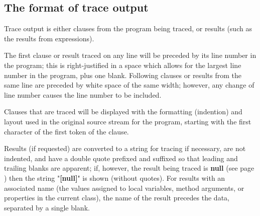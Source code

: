 \subsection{The format of trace output}
 
Trace output is either clauses from the program being traced, or results
(such as the results from expressions).
 
The first clause or result traced on any line will be preceded by its
line number in the program; this is right-justified in a space which
allows for the largest line number in the program, plus one blank.
Following clauses or results from the same line are preceded by white
space of the same width; however, any change of line number causes the
line number to be included.
 
Clauses that are traced will be displayed with the formatting
(indention) and layout used in the original source stream for the
program, starting with the first character of the first token of the
clause.
 
Results (if requested) are converted to a string for tracing if
necessary, are not indented, and have a double quote prefixed and
suffixed so that leading and trailing blanks are apparent; if, however,
the result being traced is  \textbf{null} (see page \pageref{refswnull})  then the
string "\textbf{[null]}" is shown (without quotes).
For results with an associated name (the values assigned to local
variables, method arguments, or properties in the current class), the
name of the result precedes the data, separated by a single blank.
 
